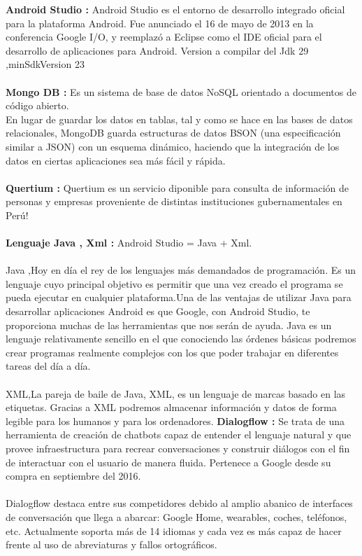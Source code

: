 \documentclass[preprint,12pt]{elsarticle}
\begin{document}
\textbf{Android Studio :}  Android Studio es el entorno de desarrollo integrado oficial para la plataforma Android. Fue anunciado el 16 de mayo de 2013 en la conferencia Google I/O, y reemplazó a Eclipse como el IDE oficial para el desarrollo de aplicaciones para Android.
Version a compilar del Jdk 29 ,minSdkVersion 23
\\\\
\textbf{Mongo DB :} Es un sistema de base de datos NoSQL orientado a documentos de código abierto.
\\
En lugar de guardar los datos en tablas, tal y como se hace en las bases de datos relacionales, MongoDB guarda estructuras de datos BSON (una especificación similar a JSON) con un esquema dinámico, haciendo que la integración de los datos en ciertas aplicaciones sea más fácil y rápida.
\\ \\
\textbf{Quertium :} Quertium es un servicio diponible para
consulta de información de personas y empresas
proveniente de distintas instituciones gubernamentales
en Perú!
\\\\
\textbf{Lenguaje Java , Xml  :} Android Studio = Java + Xml.
\\  \\
Java ,Hoy en día el rey de los lenguajes más demandados de programación. Es un lenguaje cuyo principal objetivo es permitir que una vez creado el programa se pueda ejecutar en cualquier plataforma.Una de las ventajas de utilizar Java para desarrollar aplicaciones Android es que Google, con Android Studio, te proporciona muchas de las herramientas que nos serán de ayuda. Java es un lenguaje relativamente sencillo en el que conociendo las órdenes básicas podremos crear programas realmente complejos con los que poder trabajar en diferentes tareas del día a día.
\\  \\
XML,La pareja de baile de Java, XML, es un lenguaje de marcas basado en las etiquetas. Gracias a XML podremos almacenar información y datos de forma legible para los humanos y para los ordenadores.
\textbf{Dialogflow :} Se trata de una herramienta de creación de chatbots capaz de entender el lenguaje natural y que provee infraestructura para recrear conversaciones y construir diálogos con el fin de interactuar con el usuario de manera fluida. Pertenece a Google desde su compra en septiembre del 2016.
\\  \\
Dialogflow destaca entre sus competidores debido al amplio abanico de interfaces de conversación que llega a abarcar: Google Home, wearables, coches, teléfonos, etc. Actualmente soporta más de 14 idiomas y cada vez es más capaz de hacer frente al uso de abreviaturas y fallos ortográficos.
\end{document}
